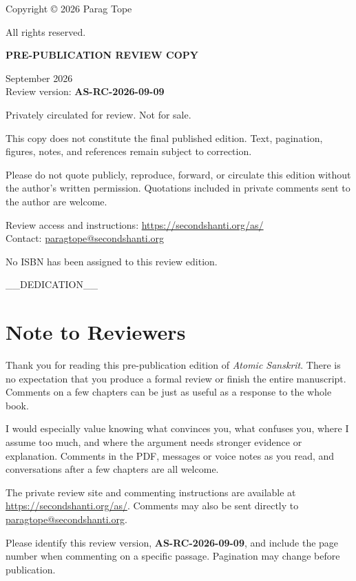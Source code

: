 \thispagestyle{empty}
\vspace*{\fill}

Copyright © 2026 Parag Tope

\medskip
All rights reserved.

\bigskip
\textbf{PRE-PUBLICATION REVIEW COPY}

\medskip
September 2026\\
Review version: \textbf{AS-RC-2026-09-09}

\medskip
Privately circulated for review. Not for sale.

\medskip
This copy does not constitute the final published edition. Text, pagination,
figures, notes, and references remain subject to correction.

\medskip
Please do not quote publicly, reproduce, forward, or circulate this edition
without the author's written permission. Quotations included in private
comments sent to the author are welcome.

\medskip
Review access and instructions: \url{https://secondshanti.org/as/}\\
Contact: \href{mailto:paragtope@secondshanti.org}{paragtope@secondshanti.org}

\medskip
No ISBN has been assigned to this review edition.

\vspace*{\fill}
\clearpage

__DEDICATION__

\setcounter{tocdepth}{2}
\tableofcontents
\cleardoublepage

\begingroup
\renewcommand{\numberline}[1]{}
\listoffigures
\endgroup
\cleardoublepage

\chapter*{Note to Reviewers}

Thank you for reading this pre-publication edition of \emph{Atomic Sanskrit}.
There is no expectation that you produce a formal review or finish the entire
manuscript. Comments on a few chapters can be just as useful as a response to
the whole book.

I would especially value knowing what convinces you, what confuses you, where
I assume too much, and where the argument needs stronger evidence or
explanation. Comments in the PDF, messages or voice notes as you read, and
conversations after a few chapters are all welcome.

The private review site and commenting instructions are available at
\url{https://secondshanti.org/as/}. Comments may also be sent directly to
\href{mailto:paragtope@secondshanti.org}{paragtope@secondshanti.org}.

Please identify this review version, \textbf{AS-RC-2026-09-09}, and include
the page number when commenting on a specific passage. Pagination may change
before publication.

\cleardoublepage
